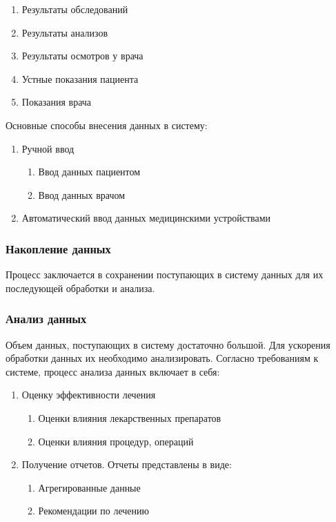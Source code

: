\begin{enumerate}
  \item Результаты обследований
  \item Результаты анализов
  \item Результаты осмотров у врача
  \item Устные показания пациента
  \item Показания врача 
\end{enumerate}

Основные способы внесения данных в систему:

\begin{enumerate}
  \item Ручной ввод
  \begin{enumerate}
    \item Ввод данных пациентом
    \item Ввод данных врачом
  \end{enumerate}
  \item Автоматический ввод данных медицинскими устройствами
\end{enumerate}

\subsubsection{Накопление данных}
Процесс заключается в сохранении поступающих в систему данных для их последующей
обработки и анализа.

\subsubsection{Анализ данных}
Объем данных, поступающих в систему достаточно большой. Для ускорения обработки
данных их необходимо анализировать. Согласно требованиям к системе, процесс
анализа данных включает в себя:

\begin{enumerate}
  \item Оценку эффективности лечения
  \begin{enumerate}
    \item Оценки влияния лекарственных препаратов
    \item Оценки влияния процедур, операций 
  \end{enumerate}
  \item Получение отчетов. Отчеты представлены в виде:
  \begin{enumerate}
    \item Агрегированные данные
    \item Рекомендации по лечению
  \end{enumerate}  
\end{enumerate}










